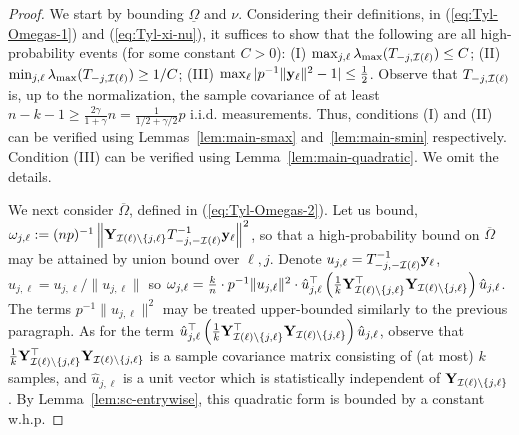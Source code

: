 \documentclass[times,sort&compress,3p]{elsarticle}
\begin{document}
\begin{proof}
    We start by bounding $\underline{\Omega}$ and $\nu$. Considering their definitions, in (\ref{eq:Tyl-Omegas-1}) and (\ref{eq:Tyl-xi-nu}), it suffices to show that the following are all high-probability events (for some constant $C>0$): 
    (I) $\max_{j,\ell}\lambda_{\max}(T_{-j,\mathcal{I}(\ell)}) \le C$; (II) $\min_{j,\ell}\lambda_{\max}(T_{-j,\mathcal{I}(\ell)}) \ge 1/C$; (III) $\max_{\ell}|p^{-1}\|{\bf y}_\ell\|^2-1|\le \frac12$. Observe that $T_{-j,\mathcal{I}(\ell)}$ is, 
    up to the normalization, the sample covariance of at least $n-k-1\ge \frac{2\gamma}{1+\gamma}n=\frac{1}{1/2+\gamma/2}p$ i.i.d. measurements. Thus, 
    conditions (I) and (II) can be verified using Lemmas~\ref{lem:main-smax} and~\ref{lem:main-smin} respectively.
    Condition (III) can be verified using Lemma~\ref{lem:main-quadratic}. We omit the details.
    
    We next consider $\overline{\Omega}$, defined in (\ref{eq:Tyl-Omegas-2}). Let us bound, $\omega_{j,\ell}:=(np)^{-1}\left\| {\bf Y}_{\mathcal{I}(\ell)\setminus\{j,\ell\}}T_{-j,-\mathcal{I}(\ell)}^{-1}{\bf y}_\ell \right\|^2$, so that a high-probability bound on $\overline{\Omega}$ may be attained by union bound over $\ell,j$. Denote $u_{j,\ell}=T_{-j,-\mathcal{I}(\ell)}^{-1}{\bf y}_\ell$, $\hat{u}_{j,\ell}={u}_{j,\ell}/\|{u}_{j,\ell}\|$ so $\omega_{j,\ell}=\frac{k}{n} \cdot p^{-1}\|{u}_{j,\ell}\|^2 \cdot \hat{u}_{j,\ell}^\top \left(\frac1k{\bf Y}_{\mathcal{I}(\ell)\setminus\{j,\ell\}}^\top {\bf Y}_{\mathcal{I}(\ell)\setminus\{j,\ell\}}\right) \hat{u}_{j,\ell} $. The terms $p^{-1}\|u_{j,\ell}\|^2$ may be treated upper-bounded similarly to the previous paragraph. As for the term $\hat{u}_{j,\ell}^\top \left(\frac1k{\bf Y}_{\mathcal{I}(\ell)\setminus\{j,\ell\}}^\top {\bf Y}_{\mathcal{I}(\ell)\setminus\{j,\ell\}}\right) \hat{u}_{j,\ell}$, observe that $\frac1k{\bf Y}_{\mathcal{I}(\ell)\setminus\{j,\ell\}}^\top {\bf Y}_{\mathcal{I}(\ell)\setminus\{j,\ell\}}$ is a sample covariance matrix consisting of (at most) $k$ samples, and $\hat{u}_{j,\ell}$ is a unit vector which is statistically independent of ${\bf Y}_{\mathcal{I}(\ell)\setminus\{j,\ell\}}$. By Lemma~\ref{lem:sc-entrywise}, this quadratic form is bounded by a constant w.h.p.
    
\end{proof}
\end{document}
